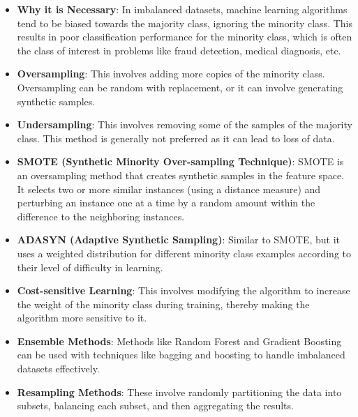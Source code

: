     \begin{itemize}
        \item \textbf{Why it is Necessary}: In imbalanced datasets, machine learning algorithms tend to be biased towards the majority class, ignoring the minority class. This results in poor classification performance for the minority class, which is often the class of interest in problems like fraud detection, medical diagnosis, etc.
        
        \item \textbf{Oversampling}: This involves adding more copies of the minority class. Oversampling can be random with replacement, or it can involve generating synthetic samples.
        
        \item \textbf{Undersampling}: This involves removing some of the samples of the majority class. This method is generally not preferred as it can lead to loss of data.
        
        \item \textbf{SMOTE (Synthetic Minority Over-sampling Technique)}: SMOTE is an oversampling method that creates synthetic samples in the feature space. It selects two or more similar instances (using a distance measure) and perturbing an instance one at a time by a random amount within the difference to the neighboring instances.
        
        \item \textbf{ADASYN (Adaptive Synthetic Sampling)}: Similar to SMOTE, but it uses a weighted distribution for different minority class examples according to their level of difficulty in learning. 
        
        \item \textbf{Cost-sensitive Learning}: This involves modifying the algorithm to increase the weight of the minority class during training, thereby making the algorithm more sensitive to it.
        
        \item \textbf{Ensemble Methods}: Methods like Random Forest and Gradient Boosting can be used with techniques like bagging and boosting to handle imbalanced datasets effectively.
        
        \item \textbf{Resampling Methods}: These involve randomly partitioning the data into subsets, balancing each subset, and then aggregating the results.
    \end{itemize}

